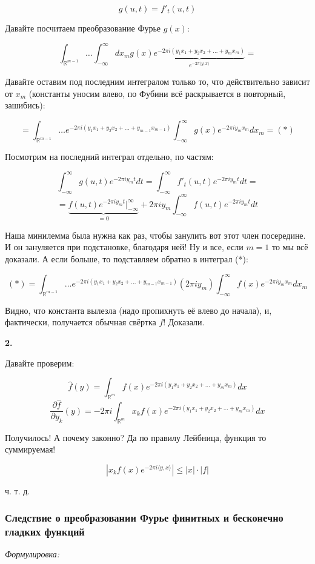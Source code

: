 \documentclass{article}
\def\sk#1#2{\langle #1, #2 \rangle}
\begin{document}
\[g(u, t) = f'_t(u, t)\]

Давайте посчитаем преобразование Фурье $g(x)$:

\[\int_{\mathbb{R}^{m-1}} \ldots \int_{-\infty}^{\infty} dx_m g(x) \underbrace{e^{- 2 \pi i (y_1 x_1 + y_2 x_2 + \ldots + y_m x_m)}}_{e^{- 2 \pi \sk{y}{x}}} = \]

Давайте оставим под последним интегралом только то, что действительно зависит от $x_m$ (константы уносим влево, по Фубини всё раскрывается в повторный, зашибись):

\[ = \int_{\mathbb{R}^{m-1}} \ldots e^{- 2 \pi i (y_1 x_1 + y_2 x_2 + \ldots + y_{m - 1} x_{m - 1})}\int_{-\infty}^{\infty} g(x) e^{-2 \pi i y_m x_m} dx_m = (*)\]

Посмотрим на последний интеграл отдельно, по частям:

\[\int_{-\infty}^{\infty} g(u , t) e^{-2 \pi i y_m t} dt = \int_{-\infty}^{\infty} f'_t(u , t) e^{-2 \pi i y_m t} dt = \] 
\[ = \underbrace{f(u, t)e^{-2 \pi i y_m t}|_{-\infty}^{\infty}}_{=0} + 2 \pi i y_m\int_{-\infty}^{\infty}f(u, t)e^{-2 \pi i y_m t}dt\]

Наша минилемма была нужна как раз, чтобы занулить вот этот член посередине. И он зануляется при подстановке, благодаря ней! Ну и все, если $m = 1$ то мы всё доказали. А если больше, то подставляем обратно в интеграл (*):

\[(*) = \int_{\mathbb{R}^{m-1}} \ldots e^{- 2 \pi i (y_1 x_1 + y_2 x_2 + \ldots + y_{m - 1} x_{m - 1})} (2\pi i y_m)\int_{-\infty}^{\infty} f(x) e^{-2 \pi i y_m x_m} dx_m \]

Видно, что константа вылезла (надо пропихнуть её влево до начала), и, фактически, получается обычная свёртка $f$! Доказали.

\textbf{2.} 

Давайте проверим:

\[\hat{f}(y) = \int_{\mathbb{R}^m} f(x)e^{-2\pi i (y_1 x_1 + y_2 x_2 + \ldots + y_m x_m)} dx\]
\[\frac{\partial \hat{f}}{\partial y_k}(y) = -2\pi i\int_{\mathbb{R}^m} x_kf(x)e^{-2\pi i (y_1 x_1 + y_2 x_2 + \ldots + y_m x_m)} dx\]

Получилось! А почему законно? Да по правилу Лейбница, функция то суммируемая!

\[|x_kf(x)e^{-2\pi i \sk{y}{x}}| \le |x| \cdot |f|\]

ч. т. д. 

\subsubsection{Следствие о преобразовании Фурье финитных и бесконечно гладких функций}
\textit{Формулировка:}
\end{document}
